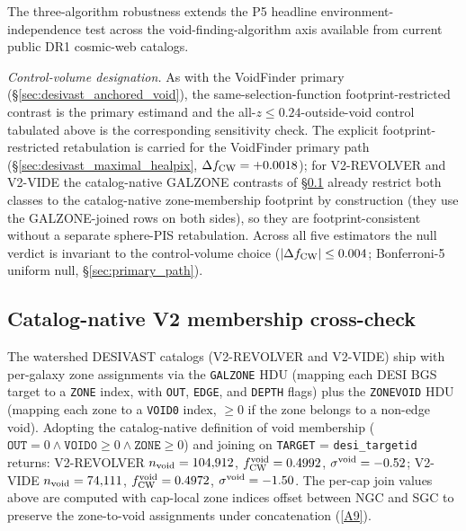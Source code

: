 \documentclass[aps,prd,twocolumn,superscriptaddress,showpacs,preprintnumbers,nofootinbib,longbibliography,floatfix]{revtex4-2}
\newcommand{\repoBase}{https://github.com/Hubify-Projects/bigbounce/blob/main}
\begin{document}
The three-algorithm robustness extends the P5 headline
environment-independence test across the void-finding-algorithm axis
available from current public DR1 cosmic-web catalogs.

\emph{Control-volume designation.} As with the VoidFinder primary
(\S\ref{sec:desivast_anchored_void}), the same-selection-function
footprint-restricted contrast is the primary estimand and the
all-$z\le0.24$-outside-void control tabulated above is the corresponding
sensitivity check. The explicit footprint-restricted retabulation is
carried for the VoidFinder primary path
(\S\ref{sec:desivast_maximal_healpix}, $\Delta f_{\rm CW} = +0.0018$);
for V2-REVOLVER and V2-VIDE the catalog-native GALZONE contrasts of
\S\ref{sec:desivast_catalog_native} already restrict both classes to the
catalog-native zone-membership footprint by construction (they use the
GALZONE-joined rows on both sides), so they are footprint-consistent
without a separate sphere-PIS retabulation. Across all five estimators
the null verdict is invariant to the control-volume choice
($|\Delta f_{\rm CW}| \le 0.004$; Bonferroni-5 uniform null,
\S\ref{sec:primary_path}).

\subsection{Catalog-native V2 membership cross-check}\label{sec:desivast_catalog_native}

The watershed
DESIVAST catalogs (V2-REVOLVER and V2-VIDE) ship with per-galaxy zone
assignments via the \texttt{GALZONE} HDU (mapping each DESI BGS target
to a \texttt{ZONE} index, with \texttt{OUT}, \texttt{EDGE}, and
\texttt{DEPTH} flags) plus the \texttt{ZONEVOID} HDU (mapping each
zone to a \texttt{VOID0} index, $\geq 0$ if the zone belongs to a
non-edge void). Adopting the catalog-native definition of void
membership ($\texttt{OUT} = 0 \wedge \texttt{VOID0} \geq 0 \wedge
\texttt{ZONE} \geq 0$) and joining on \texttt{TARGET} =
\texttt{desi\_targetid} returns: V2-REVOLVER $n_{\rm void} = 104{,}912$,
$f_{\rm CW}^{\rm void} = 0.4992$, $\sigma^{\rm void} = -0.52$; V2-VIDE
$n_{\rm void} = 74{,}111$, $f_{\rm CW}^{\rm void} = 0.4972$,
$\sigma^{\rm void} = -1.50$. The per-cap join values above are computed
with cap-local zone indices offset between NGC and SGC to preserve the
zone-to-void assignments under concatenation
(\href{\repoBase/pipelines/p5\_desi\_chirality/outputs/22\_r24conf\_local\_batch.json}{[A9]}).
\end{document}
